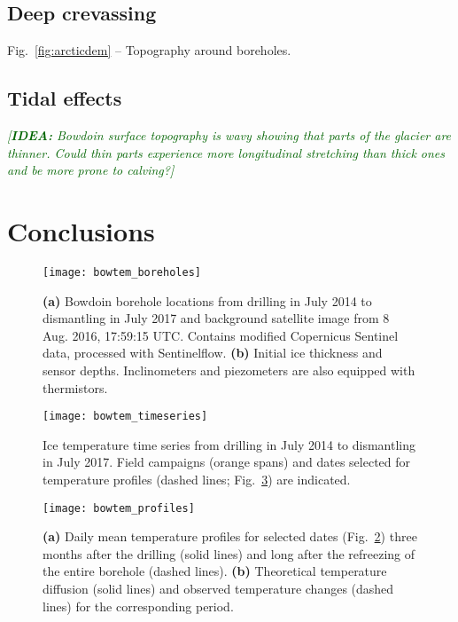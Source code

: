 \documentclass[utf8]{article}
\newcommand{\idea}[1]{\textcolor{darkgreen}{\emph{[\textbf{IDEA:} #1]}}}
\begin{document}
\subsection{Deep crevassing}
    Fig.~\ref{fig:arcticdem} -- Topography around boreholes.

\subsection{Tidal effects}
    \idea{Bowdoin surface topography is wavy showing that parts of the glacier
          are thinner. Could thin parts experience more longitudinal
          stretching than thick ones and be more prone to calving?}

\section{Conclusions}


\clearpage

    \begin{figure}
      \centerline{\texttt{[image: bowtem\_boreholes]}}
      \caption{\textbf{(a)} Bowdoin borehole locations from drilling in July
               2014 to dismantling in July 2017 and background satellite
               image from 8 Aug. 2016, 17:59:15 UTC. Contains modified
               Copernicus Sentinel data, processed with Sentinelflow.
               \textbf{(b)} Initial ice thickness and sensor depths.
               Inclinometers and piezometers are also equipped with
               thermistors.}
      \label{fig:boreholes}
    \end{figure}

    \begin{figure}
      \centerline{\texttt{[image: bowtem\_timeseries]}}
      \caption{Ice temperature time series from drilling in July 2014 to
               dismantling in July 2017. Field campaigns (orange spans) and
               dates selected for temperature profiles (dashed lines;
               Fig.~\ref{fig:profiles}) are indicated.}
      \label{fig:timeseries}
    \end{figure}

    \begin{figure}
      \centerline{\texttt{[image: bowtem\_profiles]}}
      \caption{\textbf{(a)} Daily mean temperature profiles for selected dates
               (Fig.~\ref{fig:timeseries}) three months after the drilling
               (solid lines) and long after the refreezing of the entire
               borehole (dashed lines).
               \textbf{(b)} Theoretical temperature diffusion (solid lines) and
               observed temperature changes (dashed lines) for the
               corresponding period.}
      \label{fig:profiles}
    \end{figure}
\end{document}
